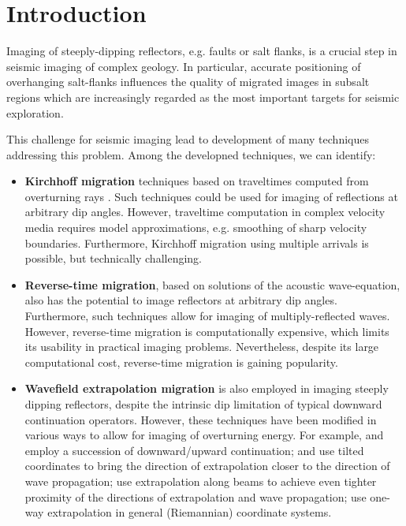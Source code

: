 \section{Introduction}
Imaging of steeply-dipping reflectors, e.g. faults or salt flanks, is a crucial step in seismic imaging of complex geology. In particular, accurate positioning of overhanging salt-flanks influences the quality of migrated images in subsalt regions which are increasingly regarded as the most important targets for seismic exploration. 
\par
This challenge for seismic imaging lead to development of many techniques addressing this problem. Among the developned techniques, we can identify:
\begin{itemize}
\item {\bf Kirchhoff migration} techniques based on traveltimes computed from overturning rays \cite[]{SEG-1991-1178,GEO66-05-16221640}. Such techniques could be used for imaging of reflections at arbitrary dip angles. However, traveltime computation in complex velocity media requires model approximations, e.g. smoothing of sharp velocity boundaries. Furthermore, Kirchhoff migration using multiple arrivals is possible, but technically challenging.
\item {\bf Reverse-time migration}, based on solutions of the acoustic wave-equation, also has the potential to image reflectors at arbitrary dip angles. Furthermore, such techniques allow for imaging of multiply-reflected waves. However, reverse-time migration is computationally expensive, which limits its usability in practical imaging problems. Nevertheless,  despite its large computational cost, reverse-time migration is gaining popularity.
\item {\bf Wavefield extrapolation migration} is also employed in imaging steeply dipping reflectors, despite the intrinsic dip limitation of typical downward continuation operators. However, these techniques have been modified in various ways to allow for imaging of overturning energy. For example, \cite{GEO57-11-14531462} and \cite{Zhang.eageab.2006} employ a succession of downward/upward continuation; \cite{GEO59-05-08010809} and \cite{SEG-2004-09690972} use tilted coordinates to bring the direction of extrapolation closer to the direction of wave propagation; \cite{SEG-2003-09770980} use extrapolation along beams to achieve even tighter proximity of the directions of extrapolation and wave propagation; \cite{SavaFomel.geo.rwe} use one-way extrapolation in general (Riemannian) coordinate systems.
\end{itemize}
